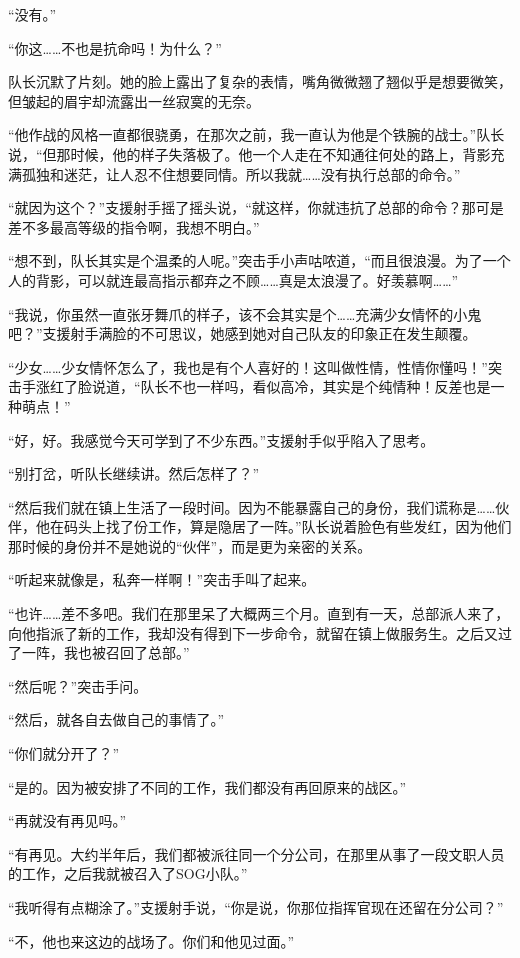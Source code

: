 “没有。”

“你这……不也是抗命吗！为什么？”

队长沉默了片刻。她的脸上露出了复杂的表情，嘴角微微翘了翘似乎是想要微笑，但皱起的眉宇却流露出一丝寂寞的无奈。

“他作战的风格一直都很骁勇，在那次之前，我一直认为他是个铁腕的战士。”队长说，“但那时候，他的样子失落极了。他一个人走在不知通往何处的路上，背影充满孤独和迷茫，让人忍不住想要同情。所以我就……没有执行总部的命令。”

“就因为这个？”支援射手摇了摇头说，“就这样，你就违抗了总部的命令？那可是差不多最高等级的指令啊，我想不明白。”

“想不到，队长其实是个温柔的人呢。”突击手小声咕哝道，“而且很浪漫。为了一个人的背影，可以就连最高指示都弃之不顾……真是太浪漫了。好羡慕啊……”

“我说，你虽然一直张牙舞爪的样子，该不会其实是个……充满少女情怀的小鬼吧？”支援射手满脸的不可思议，她感到她对自己队友的印象正在发生颠覆。

“少女……少女情怀怎么了，我也是有个人喜好的！这叫做性情，性情你懂吗！”突击手涨红了脸说道，“队长不也一样吗，看似高冷，其实是个纯情种！反差也是一种萌点！”

“好，好。我感觉今天可学到了不少东西。”支援射手似乎陷入了思考。

“别打岔，听队长继续讲。然后怎样了？”

“然后我们就在镇上生活了一段时间。因为不能暴露自己的身份，我们谎称是……伙伴，他在码头上找了份工作，算是隐居了一阵。”队长说着脸色有些发红，因为他们那时候的身份并不是她说的“伙伴”，而是更为亲密的关系。

“听起来就像是，私奔一样啊！”突击手叫了起来。

“也许……差不多吧。我们在那里呆了大概两三个月。直到有一天，总部派人来了，向他指派了新的工作，我却没有得到下一步命令，就留在镇上做服务生。之后又过了一阵，我也被召回了总部。”

“然后呢？”突击手问。

“然后，就各自去做自己的事情了。”

“你们就分开了？” 

“是的。因为被安排了不同的工作，我们都没有再回原来的战区。”

“再就没有再见吗。”

“有再见。大约半年后，我们都被派往同一个分公司，在那里从事了一段文职人员的工作，之后我就被召入了SOG小队。”

“我听得有点糊涂了。”支援射手说，“你是说，你那位指挥官现在还留在分公司？”

“不，他也来这边的战场了。你们和他见过面。”

